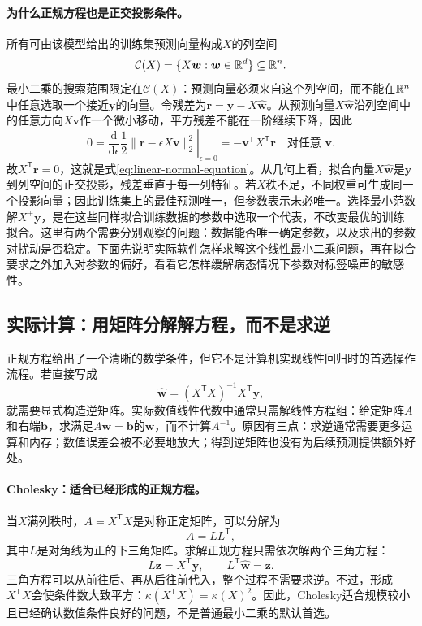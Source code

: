 \paragraph{为什么正规方程也是正交投影条件。}
所有可由该模型给出的训练集预测向量构成$X$的列空间
\begin{equation}
 \mathcal C(X)=\{X\bm w:\bm w\in\mathbb{R}^d\}\subseteq\mathbb{R}^n.
\end{equation}
最小二乘的搜索范围限定在$\mathcal C(X)$：预测向量必须来自这个列空间，而不能在$\mathbb{R}^n$中任意选取一个接近$\bm y$的向量。令残差为$\bm r=\bm y-X\hat{\bm w}$。从预测向量$X\hat{\bm w}$沿列空间中的任意方向$X\bm v$作一个微小移动，平方残差不能在一阶继续下降，因此
\begin{equation}
 0=\left.\frac{\mathrm d}{\mathrm d\epsilon}
 \frac12\|\bm r-\epsilon X\bm v\|_2^2\right|_{\epsilon=0}
 =-\bm v^{\mathsf T}X^{\mathsf T}\bm r
 \quad\text{对任意 }\bm v.
\end{equation}
故$X^{\mathsf T}\bm r=0$，这就是式\eqref{eq:linear-normal-equation}。从几何上看，拟合向量$X\hat{\bm w}$是$\bm y$到列空间的正交投影，残差垂直于每一列特征。若$X$秩不足，不同权重可生成同一个投影向量；因此训练集上的最佳预测唯一，但参数表示未必唯一。选择最小范数解$X^+\bm y$，是在这些同样拟合训练数据的参数中选取一个代表，不改变最优的训练拟合。这里有两个需要分别观察的问题：数据能否唯一确定参数，以及求出的参数对扰动是否稳定。下面先说明实际软件怎样求解这个线性最小二乘问题，再在拟合要求之外加入对参数的偏好，看看它怎样缓解病态情况下参数对标签噪声的敏感性。

\subsection{实际计算：用矩阵分解解方程，而不是求逆}
正规方程给出了一个清晰的数学条件，但它不是计算机实现线性回归时的首选操作流程。若直接写成
\begin{equation}
 \hat{\bm w}=(X^{\mathsf T}X)^{-1}X^{\mathsf T}\bm y,
\end{equation}
就需要显式构造逆矩阵。实际数值线性代数中通常只需解线性方程组：给定矩阵$A$和右端$\bm b$，求满足$A\bm w=\bm b$的$\bm w$，而不计算$A^{-1}$。原因有三点：求逆通常需要更多运算和内存；数值误差会被不必要地放大；得到逆矩阵也没有为后续预测提供额外好处。

\paragraph{Cholesky：适合已经形成的正规方程。}
当$X$满列秩时，$A=X^{\mathsf T}X$是对称正定矩阵，可以分解为
\begin{equation}
 A=LL^{\mathsf T},
\end{equation}
其中$L$是对角线为正的下三角矩阵。求解正规方程只需依次解两个三角方程：
\begin{equation}
 L\bm z=X^{\mathsf T}\bm y,
 \qquad
 L^{\mathsf T}\hat{\bm w}=\bm z.
\end{equation}
三角方程可以从前往后、再从后往前代入，整个过程不需要求逆。不过，形成$X^{\mathsf T}X$会使条件数大致平方：$\kappa(X^{\mathsf T}X)=\kappa(X)^2$。因此，Cholesky适合规模较小且已经确认数值条件良好的问题，不是普通最小二乘的默认首选。

